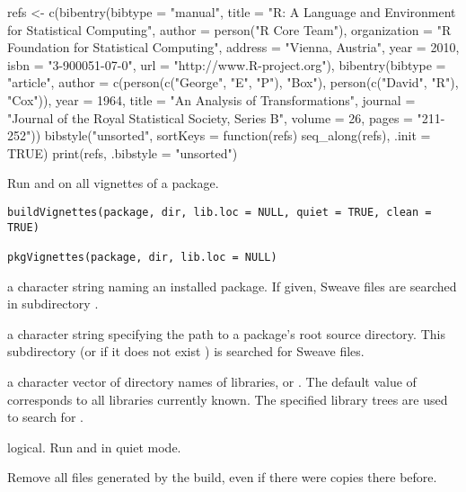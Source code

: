 %
\begin{Examples}
\begin{ExampleCode}

refs <- 
c(bibentry(bibtype = "manual",
    title = "R: A Language and Environment for Statistical Computing",
    author = person("R Core Team"),
    organization = "R Foundation for Statistical Computing",
    address = "Vienna, Austria",
    year = 2010,
    isbn = "3-900051-07-0",
    url = "http://www.R-project.org"),  
  bibentry(bibtype = "article",
    author = c(person(c("George", "E", "P"), "Box"),
               person(c("David",  "R"),      "Cox")),
    year = 1964,
    title = "An Analysis of Transformations",
    journal = "Journal of the Royal Statistical Society, Series B",
    volume = 26,
    pages = "211-252"))
bibstyle("unsorted", sortKeys = function(refs) seq_along(refs),
       .init = TRUE)
print(refs, .bibstyle = "unsorted")    
\end{ExampleCode}
\end{Examples}
%
\begin{Description}\relax
Run  and  on all vignettes
of a package.
\end{Description}
%
\begin{Usage}
\begin{verbatim}
buildVignettes(package, dir, lib.loc = NULL, quiet = TRUE, clean = TRUE)

pkgVignettes(package, dir, lib.loc = NULL)
\end{verbatim}
\end{Usage}
%
\begin{Arguments}
\begin{ldescription}
\item[\code{package}] a character string naming an installed package.  If
given, Sweave files are searched in subdirectory .
\item[\code{dir}] a character string specifying the path to a package's root
source directory.  This subdirectory  (or if it
does not exist ) is searched for Sweave files.
\item[\code{lib.loc}] a character vector of directory names of \R{} libraries,
or .  The default value of  corresponds to all
libraries currently known.  The specified library trees are used to
search for .
\item[\code{quiet}] logical. Run  and
 in quiet mode.
\item[\code{clean}] Remove all files generated by the build, even if there
were copies there before.
\end{ldescription}
\end{Arguments}
